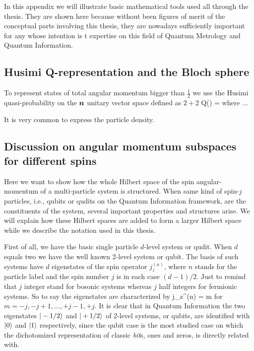 In this appendix we will illustrate basic mathematical tools used all through the thesis.
They are shown here because without been figures of merit of the conceptual parts involving this thesis, they are nowadays sufficiently important for any whose intention is t expertise on this field of Quantum Metrology and Quantum Information.

\subsection{Husimi Q-representation and the Bloch sphere}

To represent states of total angular momentum bigger than $\frac{1}{2}$ we use the Husimi quasi-probability on the $\boldsymbol{n}$ unitary vector space defined as $2+2$
\be
  Q(\alpha) = \braopket{}{\varrho}{\alpha}
\ee
where ...

It is very common to express the particle density.

\subsection{Discussion on angular momentum subspaces for different spins}
\label{app:angular-subspaces}

Here we want to show how the whole Hilbert space of the spin angular-momentum of a multi-particle system is structured.
When same kind of spin-$j$ particles, i.e., qubits or qudits on the Quantum Information framework, are the constituents of the system, several important properties and structures arise.
We will explain how these Hilbert spaces are added to form a larger Hilbert space while we describe the notation used in this thesis.

First of all, we have the basic single particle $d$-level system or qudit.
When $d$ equals two we have the well known 2-level system or qubit.
The basis of such systems have $d$ eigenstates of the spin operator $j_z^{(n)}$, where $n$ stands for the particle label and the spin number $j$ is in each case $(d-1)/2$.
Just to remind that $j$ integer stand for bosonic systems whereas $j$ half integers for fermionic systems.
So to say the eigenstates are characterized by
\be
  j_z^{(n)} = m 
\ee
for $m = -j,-j+1,\dots,+j-1,+j$.
It is clear that in Quantum Information the two eigenstates $\vert -1/2 \rangle$ and $\vert +1/2 \rangle$ of 2-level systems, or qubits, are identified with $\vert 0 \rangle$ and $\vert 1 \rangle$ respectively, since the qubit case is the most studied case on which the dichotomized representation of classic \emph{bit}s, ones and zeros, is directly related with.

